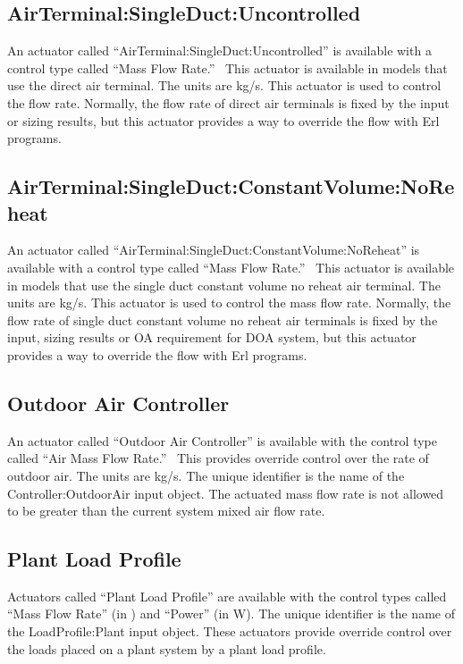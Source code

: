 \subsection{AirTerminal:SingleDuct:Uncontrolled}\label{airterminalsingleductuncontrolled}

An actuator called ``AirTerminal:SingleDuct:Uncontrolled'' is available with a control type called ``Mass Flow Rate.''~ This actuator is available in models that use the direct air terminal. The units are kg/s. This actuator is used to control the flow rate. Normally, the flow rate of direct air terminals is fixed by the input or sizing results, but this actuator provides a way to override the flow with Erl programs.

\subsection{AirTerminal:SingleDuct:ConstantVolume:NoReheat}\label{airTerminalsingleductconstantvolumenoreheat}

An actuator called ``AirTerminal:SingleDuct:ConstantVolume:NoReheat'' is available with a control type called ``Mass Flow Rate.''~ This actuator is available in models that use the single duct constant volume no reheat air terminal. The units are kg/s. This actuator is used to control the mass flow rate. Normally, the flow rate of single duct constant volume no reheat air terminals is fixed by the input, sizing results or OA requirement for DOA system, but this actuator provides a way to override the flow with Erl programs.

\subsection{Outdoor Air Controller}\label{outdoor-air-controller}

An actuator called ``Outdoor Air Controller'' is available with the control type called ``Air Mass Flow Rate.'' ~This provides override control over the rate of outdoor air. The units are kg/s. The unique identifier is the name of the Controller:OutdoorAir input object. The actuated mass flow rate is not allowed to be greater than the current system mixed air flow rate.

\subsection{Plant Load Profile}\label{plant-load-profile}

Actuators called ``Plant Load Profile'' are available with the control types called ``Mass Flow Rate'' (in \si{\massFlowRate}) and ``Power'' (in W). The unique identifier is the name of the LoadProfile:Plant input object. These actuators provide override control over the loads placed on a plant system by a plant load profile.

